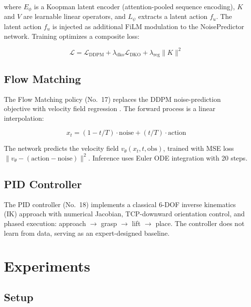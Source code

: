 \documentclass[twocolumn]{article}
\begin{document}
where $E_{\phi}$ is a Koopman latent encoder (attention-pooled sequence encoding), $K$ and $V$ are learnable linear operators, and $L_{\psi}$ extracts a latent action $f_u$. The latent action $f_u$ is injected as additional FiLM modulation to the NoisePredictor network. Training optimizes a composite loss:

\begin{equation}
    \mathcal{L} = \mathcal{L}_{\text{DDPM}} + \lambda_{\text{dko}} \mathcal{L}_{\text{DKO}} + \lambda_{\text{reg}} \|K\|^2
\end{equation}

\subsection{Flow Matching}
\label{sec:fm}

The Flow Matching policy (No.~17) replaces the DDPM noise-prediction objective with velocity field regression \cite{lipman2023flowmatching}. The forward process is a linear interpolation:

\begin{equation}
    x_t = (1 - t/T) \cdot \text{noise} + (t/T) \cdot \text{action}
\end{equation}

The network predicts the velocity field $v_{\theta}(x_t, t, \text{obs})$, trained with MSE loss $\|v_{\theta} - (\text{action} - \text{noise})\|^2$. Inference uses Euler ODE integration with 20 steps.

\subsection{PID Controller}
\label{sec:pid}

The PID controller (No.~18) implements a classical 6-DOF inverse kinematics (IK) approach with numerical Jacobian, TCP-downward orientation control, and phased execution: approach $\rightarrow$ grasp $\rightarrow$ lift $\rightarrow$ place. The controller does not learn from data, serving as an expert-designed baseline.

\section{Experiments}

\subsection{Setup}
\end{document}
